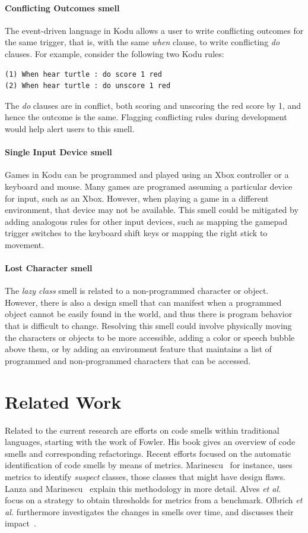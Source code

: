 \documentclass{sig-alternate}
\begin{document}
\paragraph{Conflicting Outcomes smell}
The event-driven language in Kodu allows a user to write conflicting outcomes for the same trigger, that is, with the same \emph{when} clause, to write conflicting \emph{do} clauses. For example, consider the following two Kodu rules:
\begin{verbatim}
(1) When hear turtle : do score 1 red
(2) When hear turtle : do unscore 1 red
\end{verbatim}
\noindent The \emph{do} clauses are in conflict, both scoring and unscoring the red score by 1, and hence the outcome is the same. Flagging conflicting rules during development would help alert users to this smell. 

\paragraph{Single Input Device smell}
Games in Kodu can be programmed and played using an Xbox controller or a keyboard and mouse. Many games are programed assuming a particular device for input, such as an Xbox. However, when playing a game in a different environment, that device may not be available. This smell could be mitigated by adding analogous rules for other input devices, such as mapping the gamepad trigger switches to the keyboard shift keys or mapping the right stick to movement. 

\paragraph{Lost Character smell}
The \emph{lazy class} smell is related to a non-programmed character or object. However, there is also a design smell that can manifest when a programmed object cannot be easily found in the world, and thus there is program behavior that is difficult to change. Resolving this smell could involve physically moving the characters or objects to be more accessible, adding a color or speech bubble above them, or by adding an environment feature that maintains a list of programmed and non-programmed characters that can be accessed. 	

\section{Related Work}

\label{sec:related_work}
Related to the current research are efforts on code smells within traditional languages, starting with the work of Fowler\cite{Fowl1999}. His book gives an overview of code smells and corresponding refactorings. Recent efforts focused on the automatic identification of code smells by means of metrics. Marinescu~\cite{Mari2001} for instance, uses metrics to identify \emph{suspect} classes, those classes that might have design flaws. Lanza and Marinescu~\cite{Lanz06} explain this methodology in more detail. Alves \emph{et al.}~\cite{Alves2010} focus on a strategy to obtain thresholds for metrics from a benchmark. Olbrich \emph{et al.} furthermore investigates the changes in smells over time, and discusses their impact~\cite{Olbr2009}.
\end{document}
